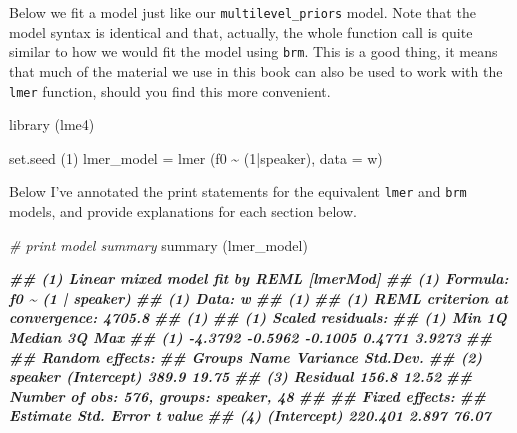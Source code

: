 \documentclass[
]{book}
\newenvironment{Shaded}{\begin{snugshade}}{\end{snugshade}}
\newcommand{\AttributeTok}[1]{\textcolor[rgb]{0.77,0.63,0.00}{#1}}
\newcommand{\CommentTok}[1]{\textcolor[rgb]{0.56,0.35,0.01}{\textit{#1}}}
\newcommand{\DecValTok}[1]{\textcolor[rgb]{0.00,0.00,0.81}{#1}}
\newcommand{\DocumentationTok}[1]{\textcolor[rgb]{0.56,0.35,0.01}{\textbf{\textit{#1}}}}
\newcommand{\FunctionTok}[1]{\textcolor[rgb]{0.00,0.00,0.00}{#1}}
\newcommand{\NormalTok}[1]{#1}
\newcommand{\OtherTok}[1]{\textcolor[rgb]{0.56,0.35,0.01}{#1}}
\newcommand{\SpecialCharTok}[1]{\textcolor[rgb]{0.00,0.00,0.00}{#1}}
\begin{document}
Below we fit a model just like our \texttt{multilevel\_priors} model. Note that the model syntax is identical and that, actually, the whole function call is quite similar to how we would fit the model using \texttt{brm}. This is a good thing, it means that much of the material we use in this book can also be used to work with the \texttt{lmer} function, should you find this more convenient.

\begin{Shaded}
\begin{Highlighting}[]
\FunctionTok{library}\NormalTok{ (lme4)}

\FunctionTok{set.seed}\NormalTok{ (}\DecValTok{1}\NormalTok{)}
\NormalTok{lmer\_model }\OtherTok{=} \FunctionTok{lmer}\NormalTok{ (f0 }\SpecialCharTok{\textasciitilde{}}\NormalTok{ (}\DecValTok{1}\SpecialCharTok{|}\NormalTok{speaker), }\AttributeTok{data =}\NormalTok{ w)}
\end{Highlighting}
\end{Shaded}

Below I've annotated the print statements for the equivalent \texttt{lmer} and \texttt{brm} models, and provide explanations for each section below.

\begin{Shaded}
\begin{Highlighting}[]
\CommentTok{\# print model summary}
\FunctionTok{summary}\NormalTok{ (lmer\_model)}

\DocumentationTok{\#\# (1) Linear mixed model fit by REML [\textquotesingle{}lmerMod\textquotesingle{}]}
\DocumentationTok{\#\# (1) Formula: f0 \textasciitilde{} (1 | speaker)}
\DocumentationTok{\#\# (1) Data: w}
\DocumentationTok{\#\# (1) }
\DocumentationTok{\#\# (1) REML criterion at convergence: 4705.8}
\DocumentationTok{\#\# (1)}
\DocumentationTok{\#\# (1) Scaled residuals: }
\DocumentationTok{\#\# (1)     Min      1Q  Median      3Q     Max }
\DocumentationTok{\#\# (1) {-}4.3792 {-}0.5962 {-}0.1005  0.4771  3.9273 }
\DocumentationTok{\#\#  }
\DocumentationTok{\#\#     Random effects:}
\DocumentationTok{\#\#      Groups   Name        Variance Std.Dev.}
\DocumentationTok{\#\# (2)  speaker  (Intercept) 389.9    19.75   }
\DocumentationTok{\#\# (3)  Residual             156.8    12.52   }
\DocumentationTok{\#\#     Number of obs: 576, groups:  speaker, 48}
\DocumentationTok{\#\#  }
\DocumentationTok{\#\#     Fixed effects:}
\DocumentationTok{\#\#                 Estimate Std. Error t value}
\DocumentationTok{\#\# (4) (Intercept)  220.401      2.897   76.07}
\end{Highlighting}
\end{Shaded}
\end{document}
